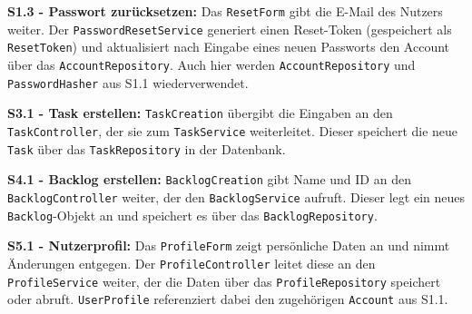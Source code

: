 \documentclass[a4paper,11pt]{article}
\begin{document}
\textbf{S1.3 - Passwort zurücksetzen:} Das \texttt{ResetForm} gibt die E-Mail des Nutzers weiter. Der \texttt{PasswordResetService} generiert einen Reset-Token (gespeichert als \texttt{ResetToken}) und aktualisiert nach Eingabe eines neuen Passworts den Account über das \texttt{AccountRepository}. Auch hier werden \texttt{AccountRepository} und \texttt{PasswordHasher} aus S1.1 wiederverwendet.

\textbf{S3.1 - Task erstellen:} \texttt{TaskCreation} übergibt die Eingaben an den \texttt{TaskController}, der sie zum \texttt{TaskService} weiterleitet. Dieser speichert die neue \texttt{Task} über das \texttt{TaskRepository} in der Datenbank.

\textbf{S4.1 - Backlog erstellen:} \texttt{BacklogCreation} gibt Name und ID an den \texttt{BacklogController} weiter, der den \texttt{BacklogService} aufruft. Dieser legt ein neues \texttt{Backlog}-Objekt an und speichert es über das \texttt{BacklogRepository}.

\textbf{S5.1 - Nutzerprofil:} Das \texttt{ProfileForm} zeigt persönliche Daten an und nimmt Änderungen entgegen. Der \texttt{ProfileController} leitet diese an den \texttt{ProfileService} weiter, der die Daten über das \texttt{ProfileRepository} speichert oder abruft. \texttt{UserProfile} referenziert dabei den zugehörigen \texttt{Account} aus S1.1.
\end{document}
